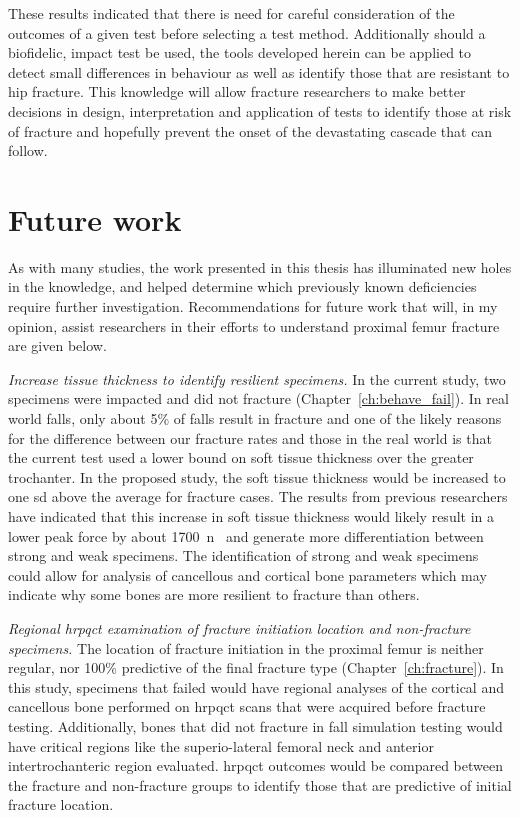 These results indicated that there is need for careful consideration of the outcomes of a given test before selecting a test method.
Additionally should a biofidelic, impact test be used, the tools developed herein can be applied to detect small differences in behaviour as well as identify those that are resistant to hip fracture.
This knowledge will allow fracture researchers to make better decisions in design, interpretation and application of tests to identify those at risk of fracture and hopefully prevent the onset of the devastating cascade that can follow.

\section{Future work}
\label{sec:discussion_future}
As with many studies, the work presented in this thesis has illuminated new holes in the knowledge, and helped determine which previously known deficiencies require further investigation.
Recommendations for future work that will, in my opinion, assist researchers in their efforts to understand proximal femur fracture are given below.

\textit{Increase tissue thickness to identify resilient specimens.}
In the current study, two specimens were impacted and did not fracture (Chapter~\ref{ch:behave_fail}).
In real world falls, only about 5\% of falls result in fracture and one of the likely reasons for the difference between our fracture rates and those in the real world is that the current test used a lower bound on soft tissue thickness over the greater trochanter.
In the proposed study, the soft tissue thickness would be increased to one \acl{sd} above the average for fracture cases.
The results from previous researchers have indicated that this increase in soft tissue thickness would likely result in a lower peak force by about 1700~\ac{n}~\citep{robinovitch_force_1995, nielson_trochanteric_2009} and generate more differentiation between strong and weak specimens.
The identification of strong and weak specimens could allow for analysis of cancellous and cortical bone parameters which may indicate why some bones are more resilient to fracture than others.

\textit{Regional \ac{hrpqct} examination of fracture initiation location and non-fracture specimens.}
The location of fracture initiation in the proximal femur is neither regular, nor 100\% predictive of the final fracture type (Chapter~\ref{ch:fracture}).
In this study, specimens that failed would have regional analyses of the cortical and cancellous bone performed on \ac{hrpqct} scans that were acquired before fracture testing.
Additionally, bones that did not fracture in fall simulation testing would have critical regions like the superio-lateral femoral neck and anterior intertrochanteric region evaluated.
\ac{hrpqct} outcomes would be compared between the fracture and non-fracture groups to identify those that are predictive of initial fracture location.

